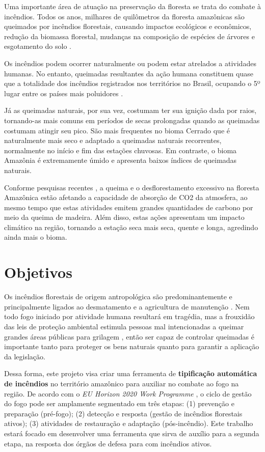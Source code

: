 Uma importante área de atuação na preservação da floresta se trata do combate à incêndios. Todos os anos, milhares de quilômetros da floresta amazônicas são queimados por incêndios florestais, causando impactos ecológicos e econômicos, redução da biomassa florestal, mudanças na composição de espécies de árvores e esgotamento do solo \cite{penha}. 

Os incêndios podem ocorrer naturalmente ou podem estar atrelados a atividades humanas. No entanto, queimadas resultantes da ação humana constituem quase que a totalidade dos incêndios registrados nos territórios no Brasil, ocupando o 5º lugar entre os países mais poluidores \cite{bdqueimadas}.

Já as queimadas naturais, por sua vez, costumam ter sua ignição dada por raios, tornando-as mais comuns em períodos de secas prolongadas quando as queimadas costumam atingir seu pico. São mais frequentes no bioma Cerrado que é naturalmente mais seco e adaptado a queimadas naturais recorrentes, normalmente no início e fim das estações chuvosas. Em contraste, o bioma Amazônia é extremamente úmido e apresenta baixos índices de queimadas naturais.

Conforme pesquisas recentes \cite{amazonia_carbono}, a queima e o desflorestamento excessivo na floresta Amazônica estão afetando a capacidade de absorção de CO2 da atmosfera, ao mesmo tempo que estas atividades emitem grandes quantidades de carbono por meio da queima de madeira. Além disso, estas ações apresentam um impacto climático na região, tornando a estação seca mais seca, quente e longa, agredindo ainda mais o bioma.

\section{Objetivos}

Os incêndios florestais de origem antropológica são predominantemente e principalmente ligados ao desmatamento e a agricultura de manutenção \cite{severidade}. Nem todo fogo iniciado por atividade humana resultará em tragédia, mas a frouxidão das leis de proteção ambiental estimula pessoas mal intencionadas a queimar grandes áreas públicas para grilagem \cite{jornal_ambiental}, então ser capaz de controlar queimadas é importante tanto para proteger os bens naturais quanto para garantir a aplicação da legislação.

Dessa forma, este projeto visa criar uma ferramenta de \textbf{tipificação automática de incêndios} no território amazônico para auxiliar no combate ao fogo na região. De acordo com o \textit{EU Horizon 2020 Work Programme} \cite{horizon}, o ciclo de gestão do fogo pode ser amplamente segmentado em três etapas: (1) prevenção e preparação (pré-fogo); (2) detecção e resposta (gestão de incêndios florestais ativos); (3) atividades de restauração e adaptação (pós-incêndio). Este trabalho estará focado em desenvolver uma ferramenta que sirva de auxílio para a segunda etapa, na resposta dos órgãos de defesa para com incêndios ativos.

